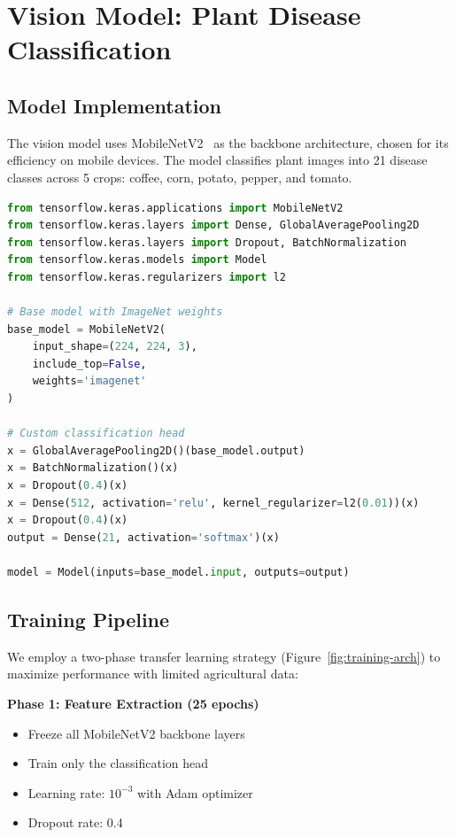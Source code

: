 \documentclass[11pt,a4paper]{article}
\begin{document}
\section{Vision Model: Plant Disease Classification}

\subsection{Model Implementation}

The vision model uses MobileNetV2~\cite{sandler2018mobilenetv2} as the backbone architecture, chosen for its efficiency on mobile devices. The model classifies plant images into 21 disease classes across 5 crops: coffee, corn, potato, pepper, and tomato.

\begin{lstlisting}[language=Python, caption={MobileNetV2 architecture with custom classification head}]
from tensorflow.keras.applications import MobileNetV2
from tensorflow.keras.layers import Dense, GlobalAveragePooling2D
from tensorflow.keras.layers import Dropout, BatchNormalization
from tensorflow.keras.models import Model
from tensorflow.keras.regularizers import l2

# Base model with ImageNet weights
base_model = MobileNetV2(
    input_shape=(224, 224, 3),
    include_top=False,
    weights='imagenet'
)

# Custom classification head
x = GlobalAveragePooling2D()(base_model.output)
x = BatchNormalization()(x)
x = Dropout(0.4)(x)
x = Dense(512, activation='relu', kernel_regularizer=l2(0.01))(x)
x = Dropout(0.4)(x)
output = Dense(21, activation='softmax')(x)

model = Model(inputs=base_model.input, outputs=output)
\end{lstlisting}

\subsection{Training Pipeline}

We employ a two-phase transfer learning strategy (Figure~\ref{fig:training-arch}) to maximize performance with limited agricultural data:

\nopagebreak
\textbf{Phase 1: Feature Extraction (25 epochs)}
\begin{itemize}
    \item Freeze all MobileNetV2 backbone layers
    \item Train only the classification head
    \item Learning rate: $10^{-3}$ with Adam optimizer
    \item Dropout rate: 0.4
\end{itemize}
\end{document}
